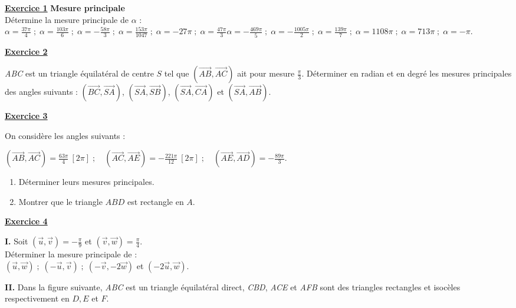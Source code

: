 \documentclass[12pt,a4paper]{article}
\begin{document}
\begin{multicols}{2}
\setlength{\columnseprule}{0.1mm} %
\textbf{\underline{Exercice 1}}\textbf{ Mesure principale}\\
Détermine la mesure principale de \( \alpha \) :\\
\(
\alpha = \frac{37\pi}{4} \;;\; \alpha = \frac{103\pi}{6} \;;\; \alpha = -\frac{58\pi}{3} \;;\; \alpha = \frac{153\pi}{1047} \;;\; \alpha = -27\pi \;;\; \alpha = \frac{47\pi}{3}
\alpha = -\frac{469\pi}{5} \;;\; \alpha = -\frac{1005\pi}{2} \;;\; \alpha = \frac{139\pi}{7} \;;\; \alpha = 1108\pi \;;\; \alpha = 713\pi \;;\; \alpha = -\pi.
\)

\textbf{\underline{Exercice 2}}

\textit{ABC} est un triangle équilatéral de centre \( S \) tel que 
\( (\overrightarrow{AB}, \overrightarrow{AC}) \) ait pour mesure \( \frac{\pi}{3} \). 
Déterminer en radian et en degré les mesures principales des angles suivants : 
\( (\overrightarrow{BC}, \overrightarrow{SA}) \), 
\( (\overrightarrow{SA}, \overrightarrow{SB}) \), 
\( (\overrightarrow{SA}, \overrightarrow{CA}) \) et 
\( (\overrightarrow{SA}, \overrightarrow{AB}) \).

\textbf{\underline{Exercice 3}}

On considère les angles suivants :

\((\overrightarrow{AB}, \overrightarrow{AC}) = \frac{63\pi}{4} \ [2\pi] \;;\quad 
(\overrightarrow{AC}, \overrightarrow{AE}) = -\frac{221\pi}{12} \ [2\pi] \;;\quad 
(\overrightarrow{AE}, \overrightarrow{AD}) = -\frac{89\pi}{3}.\)
\begin{enumerate}
    \item Déterminer leurs mesures principales.
    \item  Montrer que le triangle \( ABD \) est rectangle en \( A \).
\end{enumerate}

\textbf{\underline{Exercice 4}}

\textbf{I.} Soit \( (\overrightarrow{u}, \overrightarrow{v}) = -\frac{\pi}{9} \) et 
\( (\overrightarrow{v}, \overrightarrow{w}) = \frac{\pi}{4} \).\\
Déterminer la mesure principale de :\\
\( (\overrightarrow{u}, \overrightarrow{w}) \;;\; (-\overrightarrow{u}, \overrightarrow{v}) \;;\; 
(-\overrightarrow{v}, -2\overrightarrow{w}) \) et \( (-2\overrightarrow{u}, \overrightarrow{w}) \).

\textbf{II.} Dans la figure suivante, \textit{ABC} est un triangle équilatéral direct, 
\textit{CBD}, \textit{ACE} et \textit{AFB} sont des triangles rectangles et isocèles respectivement en 
\( D, E \) et \( F \).


\end{multicols}
\end{document}
